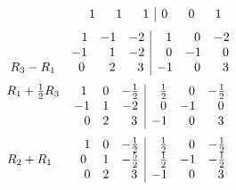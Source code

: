 \documentclass[12pt]{amsart}
\begin{document}
\begin{enumerate}
\begin{align}
\begin{array}{ccc|ccc}
				\hspace{2.3cm} 1 &\text{ } \text{ }1 &\text{ } \text{ }1 &0 &\text{ } \text{ }0 &\text{ } \text{ }1
			\end{array} \notag
		\end{align} 
		\begin{align}
			\begin{array}{ccc|ccc}
				\hspace{2.3cm} 1 &-1 &-2 &\text{ } \text{ }1 &\text{ } \text{ }0 &-2 \\
				\hspace{2cm} -1 &\text{ } \text{ }1 &-2 &\text{ } \text{ }0 &-1 &\text{ } \text{ }0  \\
				\hspace{0.2cm} R_3-R_1 \hspace{0.65cm} 0 &\text{ } \text{ }2 &\text{ } \text{ }3 &-1 &\text{ } 				\text{ }0 &\text{ } \text{ }3
			\end{array} \notag
		\end{align} 
		\begin{align}
			\begin{array}{ccc|ccc}
				R_1+\frac{1}{2}R_3 \hspace{0.6cm} 1 &0 &-\frac{1}{2} &\text{ } \text{ }\frac{1}{2} &\text{ } 					\text{ }0 &-\frac{1}{2} \\
				\hspace{2cm} -1 &1 &-2 &\text{ } \text{ }0 &-1 &\text{ } \text{ }0  \\
				\hspace{2.3cm} 0 &2 &\text{ } \text{ }3 &-1 &\text{ } \text{ }0 &\text{ } \text{ }3
			\end{array} \notag
		\end{align} 
		\begin{align}
			\begin{array}{ccc|ccc}
				\hspace{2.3cm} 1 &0 &-\frac{1}{2} &\text{ } \text{ }\frac{1}{2} &\text{ } \text{ }0 &-\frac{1}{2} \\
				R_2+R_1\hspace{0.8cm} 0 &1 &-\frac{5}{2} &\text{ } \text{ }\frac{1}{2} &-1 
				&-\frac{1}{2} \\
				\hspace{2.3cm} 0 &2 &\text{ } \text{ }3 &-1 &\text{ } \text{ }0 &\text{ } \text{ }3
			\end{array} \notag
		\end{align} 
		\begin{align}
			\begin{array}{ccc|ccc}

\end{array}
\end{align}
\end{enumerate}
\end{document}
